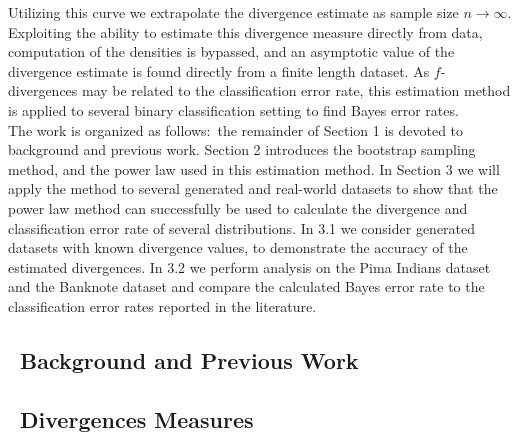 \documentclass{article}
\begin{document}
 	Utilizing this curve we extrapolate the divergence estimate as sample size $n\rightarrow\infty$. Exploiting the ability to estimate this divergence measure directly from data, computation of the densities is bypassed, and an asymptotic value of the divergence estimate is found directly from a finite length dataset. As $f$-divergences may be related to the classification error rate, this estimation method is applied to several binary classification setting to find Bayes error rates. 
 	\\ [0.5ex]
 	\indent	The work is organized as follows:\ the remainder of Section 1 is devoted to background and previous work. Section 2 introduces the bootstrap sampling method, and the power law used in this estimation method. In Section 3 we will apply the method to several generated and real-world datasets to show that the power law method can successfully be used to calculate the divergence and classification error rate of several distributions. In 3.1 we consider generated datasets with known divergence values, to demonstrate the accuracy of the estimated divergences. In 3.2 we perform analysis on the Pima Indians dataset and the Banknote dataset and compare the calculated Bayes error rate to the classification error rates reported in the literature.
	\subsection*{\ Background and Previous Work}	
	
	\subsection{\ Divergences Measures}
\end{document}
